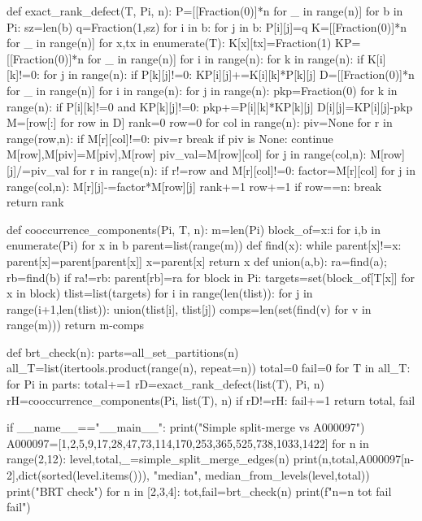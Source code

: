 def exact_rank_defect(T, Pi, n):
    P=[[Fraction(0)]*n for _ in range(n)]
    for b in Pi:
        sz=len(b)
        q=Fraction(1,sz)
        for i in b:
            for j in b:
                P[i][j]=q
    K=[[Fraction(0)]*n for _ in range(n)]
    for x,tx in enumerate(T):
        K[x][tx]=Fraction(1)
    KP=[[Fraction(0)]*n for _ in range(n)]
    for i in range(n):
        for k in range(n):
            if K[i][k]!=0:
                for j in range(n):
                    if P[k][j]!=0:
                        KP[i][j]+=K[i][k]*P[k][j]
    D=[[Fraction(0)]*n for _ in range(n)]
    for i in range(n):
        for j in range(n):
            pkp=Fraction(0)
            for k in range(n):
                if P[i][k]!=0 and KP[k][j]!=0:
                    pkp+=P[i][k]*KP[k][j]
            D[i][j]=KP[i][j]-pkp
    M=[row[:] for row in D]
    rank=0
    row=0
    for col in range(n):
        piv=None
        for r in range(row,n):
            if M[r][col]!=0:
                piv=r
                break
        if piv is None:
            continue
        M[row],M[piv]=M[piv],M[row]
        piv_val=M[row][col]
        for j in range(col,n):
            M[row][j]/=piv_val
        for r in range(n):
            if r!=row and M[r][col]!=0:
                factor=M[r][col]
                for j in range(col,n):
                    M[r][j]-=factor*M[row][j]
        rank+=1
        row+=1
        if row==n:
            break
    return rank

def cooccurrence_components(Pi, T, n):
    m=len(Pi)
    block_of={x:i for i,b in enumerate(Pi) for x in b}
    parent=list(range(m))
    def find(x):
        while parent[x]!=x:
            parent[x]=parent[parent[x]]
            x=parent[x]
        return x
    def union(a,b):
        ra=find(a); rb=find(b)
        if ra!=rb:
            parent[rb]=ra
    for block in Pi:
        targets=set(block_of[T[x]] for x in block)
        tlist=list(targets)
        for i in range(len(tlist)):
            for j in range(i+1,len(tlist)):
                union(tlist[i], tlist[j])
    comps=len(set(find(v) for v in range(m)))
    return m-comps

def brt_check(n):
    parts=all_set_partitions(n)
    all_T=list(itertools.product(range(n), repeat=n))
    total=0
    fail=0
    for T in all_T:
        for Pi in parts:
            total+=1
            rD=exact_rank_defect(list(T), Pi, n)
            rH=cooccurrence_components(Pi, list(T), n)
            if rD!=rH:
                fail+=1
    return total, fail

if __name__=="__main__":
    print("Simple split-merge vs A000097")
    A000097=[1,2,5,9,17,28,47,73,114,170,253,365,525,738,1033,1422]
    for n in range(2,12):
        level,total,_=simple_split_merge_edges(n)
        print(n,total,A000097[n-2],dict(sorted(level.items())), "median", median_from_levels(level,total))
    print("BRT check")
    for n in [2,3,4]:
        tot,fail=brt_check(n)
        print(f"n={n} {tot} fail {fail}")

